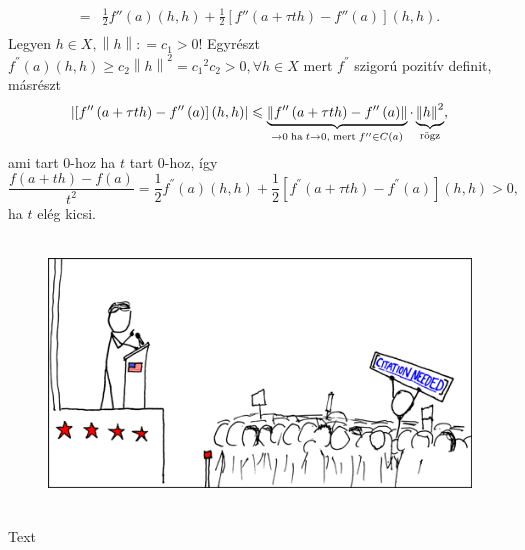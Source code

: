 \documentclass[12pt,a4paper]{scrartcl}
\newenvironment{bizonyitas}{}{}
\newenvironment{ajanlofig}{\begin{figure}\begin{center}}{
\end{center}\end{figure}}
\begin{document}
\begin{bizonyitas}
\begin{enumerate}
\[\begin{aligned}
     =  & \frac{1}{2}f''\left( a \right)\left( {h,h} \right) + \frac{1}{2}\left[ {f''\left( {a + \tau th} \right) - f''\left( a \right)} \right]\left( {h,h} \right) .\\ 
  \end{aligned} \] Legyen \(h \in X,\left\| h \right\|: = c_{1} > 0\)!
  Egyrészt
  \(f^{''}\left( a \right)\left( {h,h} \right) \geq c_{2}\left\| h \right\|^{2} = c_{1}{}^{2}c_{2} > 0,\forall h \in X\)
  mert \(f^{''}\) szigorú pozitív definit, másrészt
  \[\left| {\left[ {f''\left( {a + \tau th} \right) - f''\left( a \right)} \right]\left( {h,h} \right)} \right| \leqslant \underbrace {\left\| {f''\left( {a + \tau th} \right) - f''\left( a \right)} \right\|}_{ \to 0{\text{\;ha\;}}t \to 0,{\text{\;mert\;}}f'' \in C\left( a \right)} \cdot \underbrace {{{\left\| h \right\|}^2}}_{{\text{rögz}}},\]
  ami tart 0-hoz ha \(t\) tart 0-hoz, így
  \[\frac{f\left( {a + th} \right) - f\left( a \right)}{t^{2}} = \frac{1}{2}f^{''}\left( a \right)\left( {h,h} \right) + \frac{1}{2}\left\lbrack {f^{''}\left( {a + \tau th} \right) - f^{''}\left( a \right)} \right\rbrack\left( {h,h} \right) > 0,\]
  ha \(t\) elég kicsi.
\end{enumerate}

\end{bizonyitas}

\begin{ajanlo}

\begin{ajanlofig}

\href{https://xkcd.com}{\includegraphics[width=5.20833in,height=2.82292in]{wikipedian_protester.png}}

\end{ajanlofig}

Text

\end{ajanlo}
\end{document}
